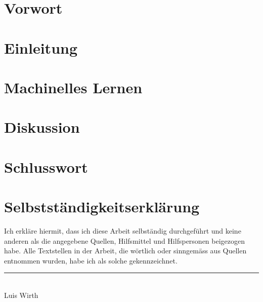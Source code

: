 \documentclass[12pt, a4paper]{article}
\begin{document}

\pagebreak

\tableofcontents

\pagebreak

\section{Vorwort}

\pagebreak

\section{Einleitung}

\pagebreak

\section{Machinelles Lernen}

\pagebreak

\section{Diskussion}

\pagebreak

\section{Schlusswort}

\pagebreak

\printbibliography[heading=bibintoc]
\pagebreak

\listoffigures
\pagebreak

\listoftables
\pagebreak

\section*{Selbstständigkeitserklärung}
Ich erkläre hiermit, dass ich diese Arbeit selbständig durchgeführt und keine anderen als die angegebene Quellen, Hilfsmittel und Hilfspersonen beigezogen habe. Alle Textstellen in der Arbeit, die wörtlich oder sinngemäss aus Quellen entnommen wurden, habe ich als solche gekennzeichnet.

\vspace{2cm}
\begin{center}
    \noindent\rule{5cm}{0.4pt}\\
    Luis Wirth
\end{center}


\begin{figure}
    \centering
    
\end{figure}
\end{document}
